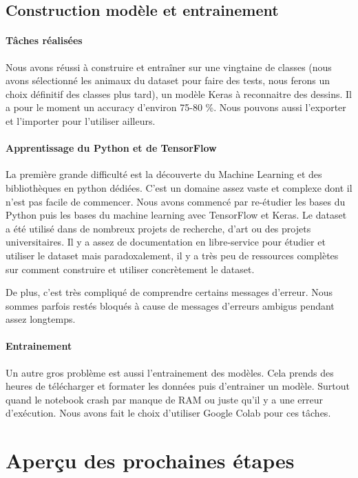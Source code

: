 \documentclass{article}
\begin{document}
\subsection{Construction modèle et entrainement}

\paragraph{Tâches réalisées} Nous avons réussi à construire et entraîner sur une vingtaine de classes (nous avons sélectionné les animaux du dataset pour faire des tests, nous ferons un choix définitif des classes plus tard), un modèle Keras à reconnaitre des dessins. Il a pour le moment un accuracy d'environ 75-80 \%. Nous pouvons aussi l'exporter et l'importer pour l'utiliser ailleurs.

\paragraph{Apprentissage du Python et de TensorFlow} La première grande difficulté est la découverte du Machine Learning et des bibliothèques en python dédiées. C'est un domaine assez vaste et complexe dont il n'est pas facile de commencer. Nous avons commencé par re-étudier les bases du Python puis les bases du machine learning avec TensorFlow et Keras. Le dataset a été utilisé dans de nombreux projets de recherche, d'art ou des projets universitaires. Il y a assez de documentation en libre-service pour étudier et utiliser le dataset mais paradoxalement, il y a très peu de ressources complètes sur comment construire et utiliser concrètement le dataset.

De plus, c'est très compliqué de comprendre certains messages d'erreur. Nous sommes parfois restés bloqués à cause de messages d'erreurs ambigus pendant assez longtemps.

\paragraph{Entrainement} Un autre gros problème est aussi l'entrainement des modèles. Cela prends des heures de télécharger et formater les données puis d'entrainer un modèle. Surtout quand le notebook crash par manque de RAM ou juste qu'il y a une erreur d'exécution. Nous avons fait le choix d'utiliser Google Colab pour ces tâches.

\section{Aperçu des prochaines étapes}
\end{document}
